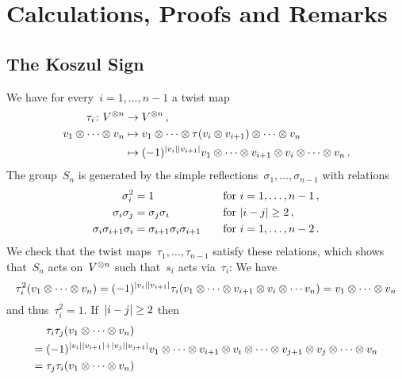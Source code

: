 \section{Calculations, Proofs and Remarks}





\subsection{The Koszul Sign}
\label{koszul sign proof}

We have for every~$i = 1, \dotsc, n-1$ a twist map
\begin{align*}
  \tau_i
  \colon
  V^{\otimes n}
  &\to
  V^{\otimes n} \,,
  \\
  v_1 \otimes \dotsb \otimes v_n
  &\mapsto
  v_1 \otimes \dotsb \otimes \tau(v_i \otimes v_{i+1}) \otimes \dotsb \otimes v_n
  \\
  &\mapsto
  (-1)^{\lvert v_i\rvert \lvert v_{i+1}\rvert}
  v_1 \otimes \dotsb \otimes v_{i+1} \otimes v_i \otimes \dotsb \otimes v_n \,.
\end{align*}
The group~$S_n$ is generated by the simple reflections~$\sigma_1, \dotsc, \sigma_{n-1}$ with relations
\begin{alignat*}{2}
  \sigma_i^2
  &=
  1
  &
  \quad
  &\text{for~$i = 1, \dotsc, n-1$} \,,
  \\
  \sigma_i \sigma_j
  &=
  \sigma_j \sigma_i
  &
  \quad
  &\text{for~$\lvert i-j\rvert \geq 2$} \,,
  \\
  \sigma_i \sigma_{i+1} \sigma_i
  &=
  \sigma_{i+1} \sigma_i \sigma_{i+1}
  &
  \quad
  &\text{for~$i = 1, \dotsc, n-2$} \,.
\end{alignat*}
We check that the twist maps~$\tau_1, \dotsc, \tau_{n-1}$ satisfy these relations, which shows that~$S_n$ acts on~$V^{\otimes n}$ such that~$s_i$ acts via~$\tau_i$:
We have
\[
  \tau_i^2(v_1 \otimes \dotsb \otimes v_n)
  =
  (-1)^{\lvert v_i\rvert \lvert v_{i+1}\rvert}
  \tau_i(v_1 \otimes \dotsb \otimes v_{i+1} \otimes v_i \otimes \dotsb v_n)
  =
  v_1 \otimes \dotsb \otimes v_n
\]
and thus~$\tau_i^2 = 1$.
If~$\lvert i-j\rvert \geq 2$ then
\begin{align*}
  {}&
  \tau_i \tau_j (v_1 \otimes \dotsb \otimes v_n)
  \\
  ={}&
  (-1)^{\lvert v_i\rvert \lvert v_{i+1}\rvert + \lvert v_j\rvert \lvert v_{j+1}\rvert}
          v_1
  \otimes \dotsb
  \otimes v_{i+1} \otimes v_i
  \otimes \dotsb
  \otimes v_{j+1} \otimes v_j
  \otimes \dotsb
  \otimes v_n
  \\
  ={}&
  \tau_j \tau_i (v_1 \otimes \dotsb \otimes v_n)
\end{align*}
